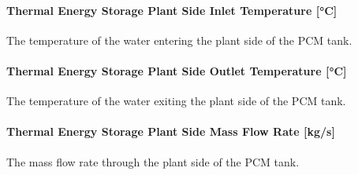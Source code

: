 \paragraph{Thermal Energy Storage Plant Side Inlet Temperature [°C]}\label{pcmstorage-plant-side-inlet-temperature}

The temperature of the water entering the plant side of the PCM tank.

\paragraph{Thermal Energy Storage Plant Side Outlet Temperature [°C]}\label{pcmstorage-plant-side-outlet-temperature}

The temperature of the water exiting the plant side of the PCM tank.

\paragraph{Thermal Energy Storage Plant Side Mass Flow Rate [kg/s]}\label{pcmstorage-plant-side-mass-flow-rate}

The mass flow rate through the plant side of the PCM tank.
